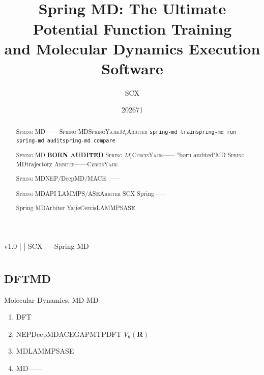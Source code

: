 \documentclass[12pt,a4paper]{article}
\title{\textbf{\SpringMD{}}\\[6pt]
\large Spring MD: The Ultimate Potential Function Training \\
and Molecular Dynamics Execution Software}
\author{SCX}
\date{202671}
\theoremstyle{remark}
\newcommand{\Spring}{\textsc{Spring}}
\newcommand{\Yajie}{\textsc{Yajie}}
\newcommand{\Cercis}{\textsc{Cercis}}
\newcommand{\Arbiter}{\textsc{Arbiter}}
\newcommand{\SpringMD}{\textsc{Spring MD}}
\begin{document}
\maketitle

\begin{center}
\footnotesize
\textbf{} v1.0 \quad | \quad
\textbf{}  \quad | \quad
\textbf{} SCX — Spring MD
\end{center}

\begin{abstract}
\SpringMD{}——
\SpringMD{}\Spring{}\Yajie{}$M_t$\Arbiter{}
\texttt{spring-md train}\texttt{spring-md run}
\texttt{spring-md audit}\texttt{spring-md compare}

\SpringMD{}
\textbf{BORN AUDITED} \Spring{}
$M_t$\Cercis{}\Yajie{}——
"born audited"MD
\textbf{} \SpringMD{}trajectory
\Arbiter{}——\Cercis{}\Yajie{}

\textbf{} \SpringMD{}NEP/DeepMD/MACE
——

\SpringMD{}API
LAMMPS/ASE\Arbiter{}
SCX Spring——

\textbf{} Spring MDArbiter
YajieCercisLAMMPSASE
\end{abstract}

\tableofcontents
\newpage

\section{}

\subsection{DFTMD}

Molecular Dynamics, MD
MD

\begin{enumerate}[label= \arabic*,leftmargin=*,itemsep=3pt]
    \item \textbf{} DFT
    \item \textbf{} NEPDeepMDACEGAPMTPDFT
    $V_\theta(\mathbf{R})$
    \item \textbf{} MDLAMMPSASE
    
    \item \textbf{} MD——
    
\end{enumerate}
\end{document}
